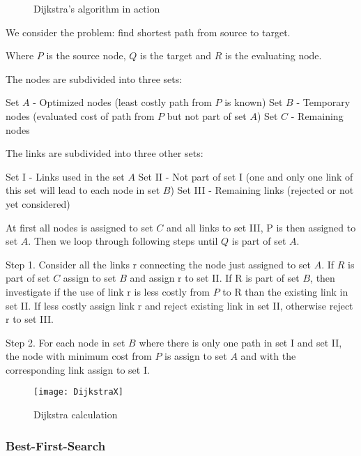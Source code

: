   \begin{figure}[ht!]
    \centering
    \caption{Dijkstra's algorithm in action}
    \label{overflow}
  \end{figure}

  We consider the problem: find shortest path from source to target.

  Where $P$ is the source node, $Q$ is the target and $R$ is the evaluating node.

  The nodes are subdivided into three sets:

  Set $A$ - Optimized nodes (least costly path from $P$ is known)
  Set $B$ - Temporary nodes (evaluated cost of path from $P$ but not part of set $A$)
  Set $C$ - Remaining nodes

  The links are subdivided into three other sets:

  Set \RN{1} - Links used in the set $A$
  Set \RN{2} - Not part of set I (one and only one link of this set will lead to each node in set $B$)
  Set \RN{3} - Remaining links (rejected or not yet considered)

  At first all nodes is assigned to set $C$ and all links to set \RN{3}, P is then assigned to set $A$.
  Then we loop through following steps until $Q$ is part of set $A$.

  Step 1. Consider all the links r connecting the node just assigned to set $A$. If $R$ is part of set $C$ assign to set $B$ and assign r to set \RN{2}. 
  If R is part of set $B$, then investigate if the use of link r is less costly from $P$ to R than the existing link in set \RN{2}. If less costly assign link r and reject existing link in set \RN{2}, otherwise reject r to set \RN{3}.

  Step 2. For each node in set $B$ where there is only one path in set \RN{1} and set \RN{2}, the node with minimum cost from $P$ is assign to set $A$ and with the corresponding link assign to set \RN{1}.

  \begin{figure}[ht!]
    \centering
    \texttt{[image: DijkstraX]}
    \caption{Dijkstra calculation}
    \label{overflow}
  \end{figure}

  \subsubsection{Best-First-Search}

